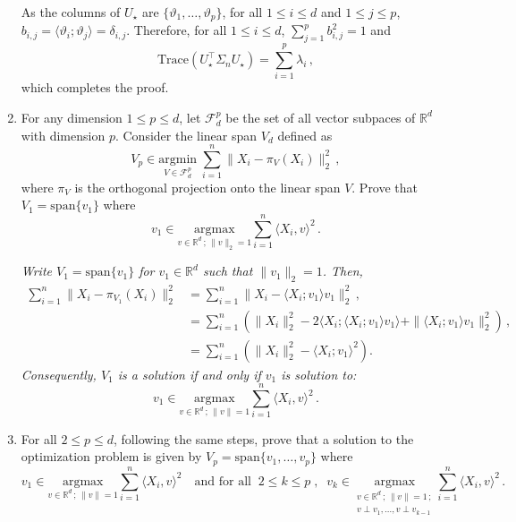 \documentclass[a4paper,10pt,fleqn]{article}
\newcommand{\eqsp}{\,}
\newcommand{\calF}{\mathcal{F}}
\newcommand{\rset}{\ensuremath{\mathbb{R}}}
\newcommand{\1}{\ensuremath{\mathbbm{1}}}
\newcommand{\bfU}{U}
\newcommand{\bfs}{\Sigma}
\begin{document}
\begin{enumerate}
{As the columns of $\bfU_{\star}$ are $\{\vartheta_1,\ldots,\vartheta_p\}$, for all $1\leqslant i\leqslant d$ and $1\leqslant j \leqslant p$, $b_{i,j} = \langle \vartheta_i;\vartheta_j\rangle = \delta_{i,j}$. Therefore,  for all $1\leqslant i\leqslant d$, $\sum_{j=1}^p b^2_{i,j} = 1$ and
$$
\mathrm{Trace}(\bfU^\top_{\star}\bfs_n \bfU_{\star}) =\sum_{i = 1}^p \lambda_i\eqsp,
$$
which completes the proof.
}
\item  For any dimension $1\leqslant p \leqslant  d$, let $\calF_d^p$ be the set of all vector subpaces of $\rset^d$ with dimension $p$. Consider the linear span $V_d$ defined as
$$
V_p \in \underset{V\in \calF_d^p}{\mathrm{argmin}} \;\sum_{i=1}^n\|X_i - \pi_V(X_i)\|_2^2\eqsp,
$$
where $\pi_V$ is the orthogonal projection onto the linear span $V$. Prove that $V_1 = \mathrm{span}\{v_1\}$ where
$$
v_1 \in \underset{v \in \rset^d\,;\, \|v\|_2=1}{\mathrm{argmax}} \sum_{i=1}^n   \langle X_i, v \rangle^2\eqsp.
$$

\vspace{.2cm}

{\em
Write $V_1 = \mathrm{span}\{v_1\}$ for $v_1\in \rset^d$ such that $\|v_1\|_2 = 1$. Then,
\begin{align*}
\sum_{i=1}^n\|X_i - \pi_{V_1}(X_i)\|_2^2 & = \sum_{i=1}^n\|X_i -  \langle X_i; v_1 \rangle v_1 \|_2^2\eqsp,\\
& = \sum_{i=1}^n \left( \|X_i\|_2^2 - 2 \langle X_i; \langle X_i; v_1 \rangle v_1 \rangle + \| \langle X_i; v_1 \rangle v_1 \|_2^2 \right)\eqsp,\\
& = \sum_{i=1}^n \left( \|X_i\|_2^2 -   \langle X_i; v_1 \rangle^2 \right).
\end{align*}
Consequently, $V_1$ is a solution  if and only if $v_1$ is solution to:
$$
v_1 \in \underset{v \in \rset^d\,;\, \|v\|=1}{\mathrm{argmax}} \sum_{i=1}^n   \langle X_i, v \rangle^2\eqsp.
$$
}
\item For all $2\leqslant p \leqslant d$, following the same steps, prove that a solution to the optimization problem is given by $V_p = \mathrm{span}\{v_1, \ldots, v_p\}$ where
\begin{equation}
\label{eq:vecpca}
v_1 \in \underset{v\in \rset^d\,;\,\|v\|=1}{\mathrm{argmax}} \sum_{i=1}^n\langle X_i,v\rangle^2 \quad\mbox{and for all}\;\; 2\leqslant k \leqslant p\;,\;\; v_k \in \underset{\substack{v\in \rset^d\,;\,\|v\|=1\,;\\ v\perp v_1,\ldots,v\perp v_{k-1}}}{\mathrm{argmax}}\sum_{i=1}^n\langle X_i,v\rangle^2\eqsp.
\end{equation}


\end{enumerate}
\end{document}
